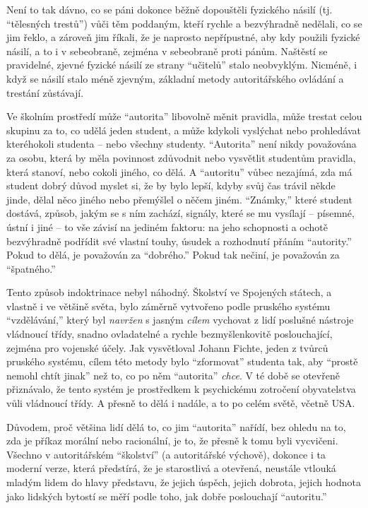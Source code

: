 \documentclass{book}
\begin{document}
Není to tak dávno, co se páni dokonce běžně dopouštěli fyzického násilí (tj. \enquote{tělesných trestů}) vůči těm poddaným, kteří rychle a bezvýhradně nedělali, co se jim řeklo, a zároveň jim říkali, že je naprosto nepřípustné, aby kdy použili fyzické násilí, a to i v sebeobraně, zejména v sebeobraně proti pánům. Naštěstí se pravidelné, zjevné fyzické násilí ze strany \enquote{učitelů} stalo neobvyklým. Nicméně, i když se násilí stalo méně zjevným, základní metody autoritářského ovládání a trestání zůstávají.

Ve školním prostředí může \enquote{autorita} libovolně měnit pravidla, může trestat celou skupinu za to, co udělá jeden student, a může kdykoli vyslýchat nebo prohledávat kteréhokoli studenta -- nebo všechny studenty. \enquote{Autorita} není nikdy považována za osobu, která by měla povinnost zdůvodnit nebo vysvětlit studentům pravidla, která stanoví, nebo cokoli jiného, co dělá. A \enquote{autoritu} vůbec nezajímá, zda má student dobrý důvod myslet si, že by bylo lepší, kdyby svůj čas trávil někde jinde, dělal něco jiného nebo přemýšlel o něčem jiném. \enquote{Známky,} které student dostává, způsob, jakým se s ním zachází, signály, které se mu vysílají -- písemné, ústní i jiné -- to vše závisí na jediném faktoru: na jeho schopnosti a ochotě bezvýhradně podřídit své vlastní touhy, úsudek a rozhodnutí přáním \enquote{autority.} Pokud to dělá, je považován za \enquote{dobrého.} Pokud tak nečiní, je považován za \enquote{špatného.}

Tento způsob indoktrinace nebyl náhodný. Školství ve Spojených státech, a vlastně i ve většině světa, bylo záměrně vytvořeno podle pruského systému \enquote{vzdělávání,} který byl \emph{navržen} s jasným \emph{cílem} vychovat z lidí poslušné nástroje vládnoucí třídy, snadno ovladatelné a rychle bezmyšlenkovitě poslouchající, zejména pro vojenské účely. Jak vysvětloval Johann Fichte, jeden z tvůrců pruského systému, cílem této metody bylo \enquote{zformovat} studenta tak, aby \enquote{prostě nemohl chtít jinak} než to, co po něm \enquote{autorita} \emph{chce}. V té době se otevřeně přiznávalo, že tento systém je prostředkem k psychickému zotročení obyvatelstva vůli vládnoucí třídy. A přesně to dělá i nadále, a to po celém světě, včetně USA.

Důvodem, proč většina lidí dělá to, co jim \enquote{autorita} nařídí, bez ohledu na to, zda je příkaz morální nebo racionální, je to, že přesně k tomu byli vycvičeni. Všechno v autoritářském \enquote{školství} (a autoritářské výchově), dokonce i ta moderní verze, která předstírá, že je starostlivá a otevřená, neustále vtlouká mladým lidem do hlavy představu, že jejich úspěch, jejich dobrota, jejich hodnota jako lidských bytostí se měří podle toho, jak dobře poslouchají \enquote{autoritu.}
\end{document}
